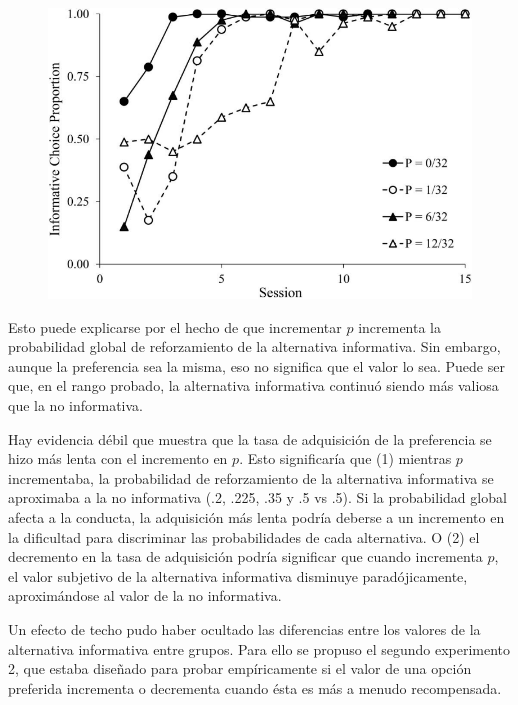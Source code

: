 \documentclass[a4paper,12pt]{article}
\begin{document}
\begin{figure}[ht]
	\begin{center}
		\includegraphics[scale=0.3]{Fortes2018.png}
	\end{center}
\end{figure}

Esto puede explicarse por el hecho de que incrementar $p$ incrementa la probabilidad global de reforzamiento de la alternativa informativa. Sin embargo, aunque la preferencia sea la misma, eso no significa que el valor lo sea. Puede ser que, en el rango probado, la alternativa informativa continuó siendo más valiosa que la no informativa.

Hay evidencia débil que muestra que la tasa de adquisición de la preferencia se hizo más lenta con el incremento en $p$. Esto significaría que (1) mientras $p$ incrementaba, la probabilidad de reforzamiento de la alternativa informativa se aproximaba a la no informativa (.2, .225, .35 y .5 vs .5). Si la probabilidad global afecta a la conducta, la adquisición más lenta podría deberse a un incremento en la dificultad para discriminar las probabilidades de cada alternativa. O (2) el decremento en la tasa de adquisición podría significar que cuando incrementa $p$, el valor subjetivo de la alternativa informativa disminuye paradójicamente, aproximándose al valor de la no informativa.

Un efecto de techo pudo haber ocultado las diferencias entre los valores de la alternativa informativa entre grupos. Para ello se propuso el segundo experimento 2, que estaba diseñado para probar empíricamente si el valor de una opción preferida incrementa o decrementa cuando ésta es más a menudo recompensada.
\end{document}
